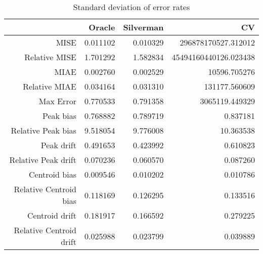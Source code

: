 \begin{table}[ht]
\centering
\begin{tabular}{rrrr}
  \hline
 & Oracle & Silverman & CV \\ 
  \hline
MISE & 0.011102 & 0.010329 & 296878170527.312012 \\ 
  Relative MISE & 1.701292 & 1.582834 & 45494160440126.023438 \\ 
  MIAE & 0.002760 & 0.002529 & 10596.705276 \\ 
  Relative MIAE & 0.034164 & 0.031310 & 131177.560609 \\ 
  Max Error & 0.770533 & 0.791358 & 3065119.449329 \\ 
  Peak bias & 0.768882 & 0.789719 & 0.837181 \\ 
  Relative Peak bias & 9.518054 & 9.776008 & 10.363538 \\ 
  Peak drift & 0.491653 & 0.423992 & 0.610823 \\ 
  Relative Peak drift & 0.070236 & 0.060570 & 0.087260 \\ 
  Centroid bias & 0.009546 & 0.010202 & 0.010786 \\ 
  Relative Centroid bias & 0.118169 & 0.126295 & 0.133516 \\ 
  Centroid drift & 0.181917 & 0.166592 & 0.279225 \\ 
  Relative Centroid drift & 0.025988 & 0.023799 & 0.039889 \\ 
   \hline
\end{tabular}
\caption{Standard deviation of error rates} 
\label{tbl:stddev_error_rates}
\end{table}
